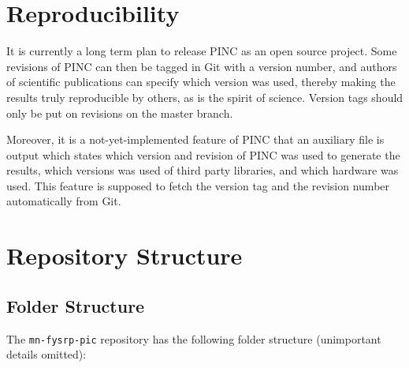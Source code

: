 \documentclass[10pt,a4paper]{article}
\newcommand{\mnfysrppic}{\texttt{mn-fysrp-pic}}
\begin{document}
%
%

\section{Reproducibility}
It is currently a long term plan to release PINC as an open source project. Some revisions of PINC can then be tagged in Git with a version number, and authors of scientific publications can specify which version was used, thereby making the results truly reproducible by others, as is the spirit of science. Version tags should only be put on revisions on the master branch.

Moreover, it is a not-yet-implemented feature of PINC that an auxiliary file is output which states which version and revision of PINC was used to generate the results, which versions was used of third party libraries, and which hardware was used. This feature is supposed to fetch the version tag and the revision number automatically from Git.

\section{Repository Structure}

\subsection{Folder Structure}
The \mnfysrppic{} repository has the following folder structure (unimportant details omitted):
\end{document}
